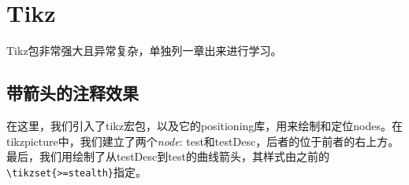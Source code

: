 {\let\clearpage\relax \chapter{Tikz}}
Tikz包非常强大且异常复杂，单独列一章出来进行学习。
\section{带箭头的注释效果}

\begin{codeshow}
    \usetikzlibrary{positioning}
    \tikzset{>=stealth}
\end{codeshow}

在这里，我们引入了tikz宏包，以及它的positioning库，用来绘制和定位nodes。在 tikzpicture中，我们建立了两个\emph{node}: test和testDesc，后者的位于前者的右上方。最后，我们用绘制了从testDesc到test的曲线箭头，其样式由之前的\verb|\tikzset{>=stealth}|指定。

\begin{latex}

\end{latex}
